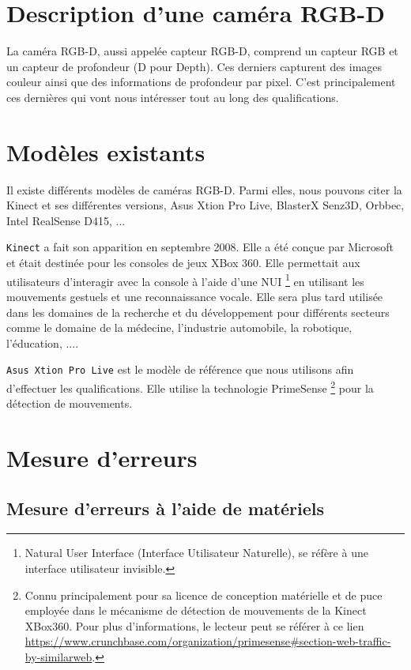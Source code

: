 \documentclass[a4paper, 12pt]{book}
\begin{document}
\section{Description d'une caméra RGB-D}

La caméra RGB-D, aussi appelée capteur RGB-D, comprend un capteur RGB et un capteur de profondeur (D pour Depth). Ces derniers capturent des images couleur ainsi que des informations de profondeur par pixel. C'est principalement ces dernières qui vont nous intéresser tout au long des qualifications.


\section{Modèles existants}
Il existe différents modèles de caméras RGB-D. Parmi elles, nous pouvons citer la Kinect et ses différentes versions, Asus Xtion Pro Live, BlasterX Senz3D, Orbbec, Intel RealSense D415, ... 
\par \texttt{Kinect} a fait son apparition en septembre 2008. Elle a été conçue par Microsoft et était destinée pour les consoles de jeux XBox 360. Elle permettait aux utilisateurs d'interagir avec la console à l'aide d'une NUI \footnote{Natural User Interface (Interface Utilisateur Naturelle), se réfère à une interface utilisateur invisible.} en utilisant les mouvements gestuels et une reconnaissance vocale. Elle sera plus tard utilisée dans les domaines de la  recherche et du développement pour différents secteurs comme le domaine de la médecine, l'industrie automobile, la robotique, l'éducation,  .... 
\par \texttt{Asus Xtion Pro Live} est le modèle de référence que nous utilisons afin d'effectuer les qualifications. Elle utilise la technologie PrimeSense  \footnote{Connu principalement pour sa licence de conception matérielle et de puce employée dans le mécanisme de détection de mouvements de la Kinect XBox360. Pour plus d'informations, le lecteur peut se référer à ce lien \url{https://www.crunchbase.com/organization/primesense#section-web-traffic-by-similarweb}.} pour la détection de mouvements.


\section{Mesure d'erreurs}

\subsection{Mesure d'erreurs à l'aide de matériels}
\end{document}
